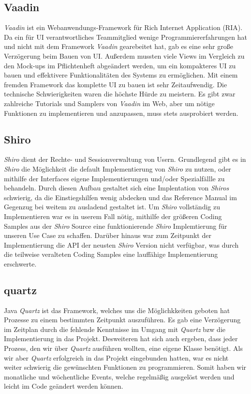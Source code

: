 \subsection{Vaadin} 
\emph{Vaadin} ist ein Webanwendungs-Framework für Rich Internet Application (RIA). Da ein für UI verantwortliches Teammitglied wenige  Programmiererfahrungen hat und nicht mit dem Framework \emph{Vaadin} gearebeitet hat, gab es eine sehr große Verzögerung beim Bauen von UI. Außerdem mussten viele Views im Vergleich zu den Mock-ups im Pflichtenheft abgeändert werden, um ein kompakteres UI zu bauen und effektivere Funktionalitäten des Systems zu ermöglichen. Mit einem fremden Framework das komplette UI zu bauen ist sehr Zeitaufwendig. Die technische Schwierigkeiten waren die höchste Hürde zu meistern. Es gibt zwar zahlreiche Tutorials und Samplers von \emph{Vaadin} im Web, aber um nötige Funktionen zu implementieren und anzupassen, muss stets ausprobiert werden. 

\subsection{Shiro}
\emph{Shiro} dient der Rechte- und Sessionverwaltung von Usern.
Grundlegend gibt es in \emph{Shiro} die Möglichkeit die default Implementierung von \emph{Shiro} zu nutzen, oder mithilfe der Interfaces
eigene Implementierungen und/oder Spezialfällle zu behandeln.
Durch diesen Aufbau gestaltet sich eine Implentation von \emph{Shiros} schwierig, da die Einstiegshilfen wenig abdecken und das Reference Manual
im Gegenzug bei weitem zu ausladend gestaltet ist. Um \emph{Shiro} vollständig zu Implementieren war es in userem Fall nötig, mithilfe der
größeren Coding Samples aus der \emph{Shiro} Source eine funktionierende \emph{Shiro} Implemtierung für unseren Use Case zu schaffen.
Darüber hinaus war zum Zeitpunkt der Implementierung die API der neusten \emph{Shiro} Version nicht verfügbar, was durch die teilweise veralteten Coding Samples
 eine lauffähige Implementierung erschwerte.
 
\subsection{quartz} 
Java \emph{Quartz} ist das Framework, welches uns die Möglichkkeiten geboten hat Prozesse zu einem bestimmten Zeitpunkt auszuführen. Es gab eine Verzögerung im Zeitplan durch die fehlende Kenntnisse im Umgang mit \emph{Quartz} bzw die Implementierung in das Projekt.
Desweiteren hat sich auch ergeben, dass jeder Prozess, den wir über \emph{Quartz} ausführen wollten, eine eigene Klasse benötigt. Als wir aber \emph{Quartz} erfolgreich in das Projekt eingebunden hatten, war es nicht weiter schwierig die gewünschten Funktionen zu programmieren. Somit haben wir monatliche und wöchentliche Events, welche regelmäßig ausgelöst werden und leicht im Code geändert werden können.

